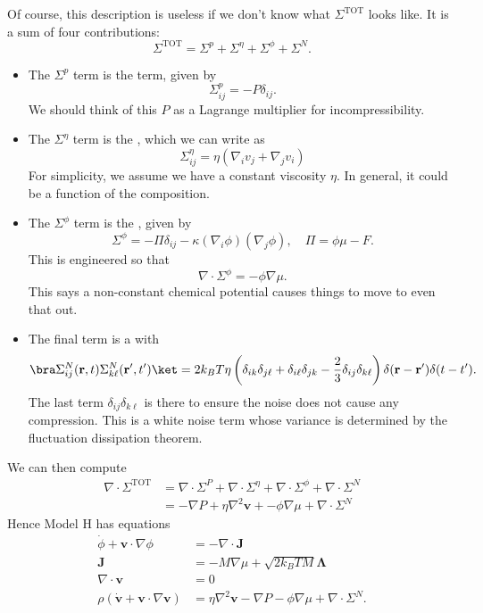 \documentclass[a4paper]{article}
\begin{document}
Of course, this description is useless if we don't know what $\Sigma^{\mathrm{TOT}}$ looks like. It is a sum of four contributions:
\[
  \Sigma^{\mathrm{TOT}} = \Sigma^p + \Sigma^\eta + \Sigma^\phi + \Sigma^N.
\]
\begin{itemize}
  \item The $\Sigma^p$ term is the  term, given by
    \[
      \Sigma_{ij}^p = - P \delta_{ij}.
    \]
    We should think of this $P$ as a Lagrange multiplier for incompressibility.
  \item The $\Sigma^{\eta}$ term is the , which we can write as
    \[
      \Sigma_{ij}^\eta = \eta (\nabla_i v_j + \nabla_j v_i)
    \]
    For simplicity, we assume we have a constant viscosity $\eta$. In general, it could be a function of the composition.
  \item The $\Sigma^{\phi}$ term is the , given by
    \[
      \Sigma^\phi = - \Pi \delta_{ij} - \kappa (\nabla_i \phi) (\nabla_j \phi),\quad \Pi = \phi \mu - F.
    \]
    This is engineered so that
    \[
      \nabla \cdot \Sigma^\phi = - \phi \nabla \mu.
    \]
    This says a non-constant chemical potential causes things to move to even that out.
  \item The final term is a  with
    \[
      \bra \Sigma_{ij}^N (\mathbf{r}, t) \Sigma_{k\ell}^N (\mathbf{r}', t')\ket = 2k_B T \eta \left(\delta_{ik} \delta_{j\ell} + \delta_{i\ell} \delta_{jk} - \frac{2}{3} \delta_{ij} \delta_{k\ell}\right) \delta(\mathbf{r} - \mathbf{r}') \delta(t - t').
    \]
    The last term $\delta_{ij} \delta_{k\ell}$ is there to ensure the noise does not cause any compression. This is a white noise term whose variance is determined by the fluctuation dissipation theorem.
\end{itemize}
We can then compute
\begin{align*}
  \nabla \cdot \Sigma^{\mathrm{TOT}} &= \nabla \cdot \Sigma^P + \nabla \cdot \Sigma^\eta + \nabla \cdot \Sigma^\phi + \nabla \cdot \Sigma^N\\
  &= - \nabla P + \eta \nabla^2 \mathbf{v} + - \phi \nabla \mu + \nabla \cdot \Sigma^N
\end{align*}
Hence Model H has equations
\begin{align*}
  \dot{\phi} + \mathbf{v} \cdot \nabla \phi &=- \nabla \cdot \mathbf{J}\\
  \mathbf{J} &= -M \nabla \mu + \sqrt{2k_B T M} \boldsymbol\Lambda\\
  \nabla \cdot \mathbf{v} &= 0\\
  \rho (\dot{\mathbf{v}} + \mathbf{v} \cdot \nabla \mathbf{v}) &= \eta \nabla^2 \mathbf{v} - \nabla P - \phi \nabla \mu + \nabla \cdot \Sigma^N.
\end{align*}
\end{document}
